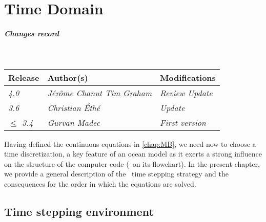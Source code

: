 \documentclass[../main/NEMO_manual]{subfiles}
\begin{document}
\chapter{Time Domain}
\label{chap:TD}

\chaptertoc

\paragraph{Changes record} ~\\

{\footnotesize
  \begin{tabularx}{0.5\textwidth}{l||X|X}
    Release          & Author(s)                                       & 
    Modifications                                                      \\
    \hline
    {\em        4.0} & {\em J\'{e}r\^{o}me Chanut \newline Tim Graham} & 
    {\em Review \newline Update                                      } \\
    {\em        3.6} & {\em Christian \'{E}th\'{e}                   } & 
    {\em Update                                                      } \\
    {\em $\leq$ 3.4} & {\em Gurvan Madec                             } & 
    {\em First version                                               } \\
  \end{tabularx}
}

\clearpage



Having defined the continuous equations in \autoref{chap:MB},
we need now to choose a time discretization,
a key feature of an ocean model as it exerts a strong influence on the structure of the computer code
(\ie\ on its flowchart).
In the present chapter, we provide a general description of the \NEMO\ time stepping strategy and
the consequences for the order in which the equations are solved.

\section{Time stepping environment}
\label{sec:TD_environment}
\end{document}
